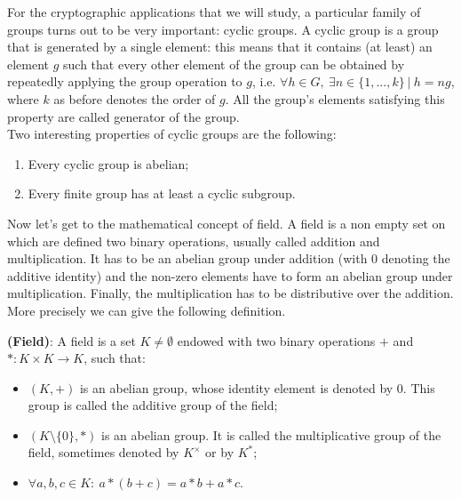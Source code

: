 \bigskip

\noindent
For the cryptographic applications that we will study, a particular family of groups turns out to be very important: cyclic groups. A cyclic group is a group that is generated by a single element: this means that it contains (at least) an element $g$ such that every other element of the group can be obtained by repeatedly applying the group operation to $g$, i.e. $\forall h \in G, \ \exists n \in \{1, ..., k\} \ | \ h = ng$, where $k$ as before denotes the order of $g$. All the group's elements satisfying this property are called generator of the group.
\\
Two interesting properties of cyclic groups are the following:
\begin{enumerate}
	\item Every cyclic group is abelian;
	\item Every finite group has at least a cyclic subgroup.
\end{enumerate}

\bigskip
\noindent
Now let's get to the mathematical concept of field. A field is a non empty set on which are defined two binary operations, usually called addition and multiplication. It has to be an abelian group under addition (with 0 denoting the additive identity) and the non-zero elements have to form an abelian group under multiplication. Finally, the multiplication has to be distributive over the addition. 
\\
More precisely we can give the following definition.
\begin{mydef} {\bf (Field)}: A field is a set $K \neq \emptyset$ endowed with two binary operations $+$ and $*: K \times K \to K$, such that:
\begin{itemize}
	\item $(K, +)$ is an abelian group, whose identity element is denoted by 0. This group is called the additive group of the field;
	\item $(K \text{\textbackslash}\{0\}, *)$ is an abelian group. It is called the multiplicative group of the field, sometimes denoted by $K^{\times}$ or by $K^*$;
	\item $\forall a, b, c \in K: \ a * (b + c) = a * b + a * c$. 
\end{itemize}
\end{mydef}

